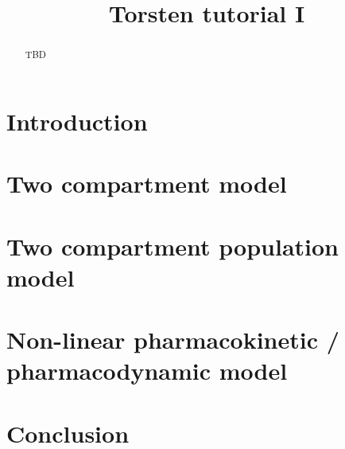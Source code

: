 \documentclass[11pt]{article}
\title{Torsten tutorial I}
\author{}
\date{}
\begin{document}
\maketitle

\begin{abstract}
  TBD
\end{abstract}

\section{Introduction}


\section{Two compartment model}


\section{Two compartment population model}


\section{Non-linear pharmacokinetic / pharmacodynamic model}


\section{Conclusion}




\end{document}
